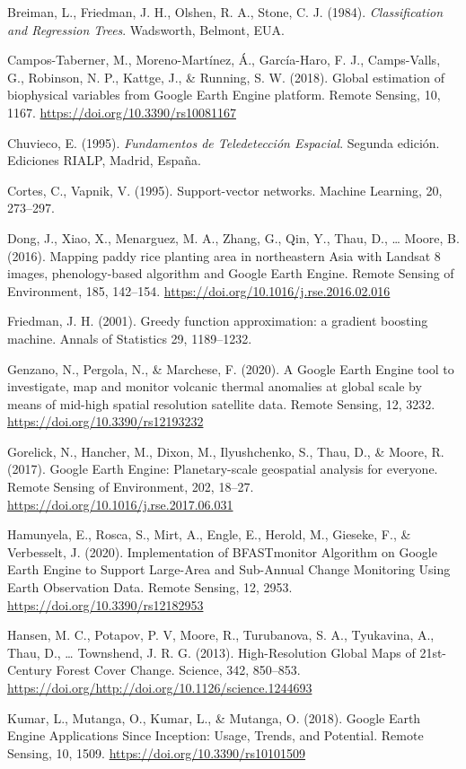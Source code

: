 \documentclass[
  12pt,
  letterpaper,
  twoside]{book}
\begin{document}
Breiman, L., Friedman, J. H., Olshen, R. A., Stone, C. J. (1984). \emph{Classification and Regression Trees}. Wadsworth, Belmont, EUA.

Campos-Taberner, M., Moreno-Martínez, Á., García-Haro, F. J., Camps-Valls, G., Robinson, N. P., Kattge, J., \& Running, S. W. (2018). Global estimation of biophysical variables from Google Earth Engine platform. Remote Sensing, 10, 1167. \url{https://doi.org/10.3390/rs10081167}

Chuvieco, E. (1995). \emph{Fundamentos de Teledetección Espacial}. Segunda edición. Ediciones RIALP, Madrid, España.

Cortes, C., Vapnik, V. (1995). Support-vector networks. Machine Learning, 20, 273--297.

Dong, J., Xiao, X., Menarguez, M. A., Zhang, G., Qin, Y., Thau, D., \ldots{} Moore, B. (2016). Mapping paddy rice planting area in northeastern Asia with Landsat 8 images, phenology-based algorithm and Google Earth Engine. Remote Sensing of Environment, 185, 142--154. \url{https://doi.org/10.1016/j.rse.2016.02.016}

Friedman, J. H. (2001). Greedy function approximation: a gradient boosting machine. Annals of Statistics 29, 1189--1232.

Genzano, N., Pergola, N., \& Marchese, F. (2020). A Google Earth Engine tool to investigate, map and monitor volcanic thermal anomalies at global scale by means of mid-high spatial resolution satellite data. Remote Sensing, 12, 3232. \url{https://doi.org/10.3390/rs12193232}

Gorelick, N., Hancher, M., Dixon, M., Ilyushchenko, S., Thau, D., \& Moore, R. (2017). Google Earth Engine: Planetary-scale geospatial analysis for everyone. Remote Sensing of Environment, 202, 18--27. \url{https://doi.org/10.1016/j.rse.2017.06.031}

Hamunyela, E., Rosca, S., Mirt, A., Engle, E., Herold, M., Gieseke, F., \& Verbesselt, J. (2020). Implementation of BFASTmonitor Algorithm on Google Earth Engine to Support Large-Area and Sub-Annual Change Monitoring Using Earth Observation Data. Remote Sensing, 12, 2953. \url{https://doi.org/10.3390/rs12182953}

Hansen, M. C., Potapov, P. V, Moore, R., Turubanova, S. A., Tyukavina, A., Thau, D., \ldots{} Townshend, J. R. G. (2013). High-Resolution Global Maps of 21st-Century Forest Cover Change. Science, 342, 850--853. \url{https://doi.org/http://doi.org/10.1126/science.1244693}

Kumar, L., Mutanga, O., Kumar, L., \& Mutanga, O. (2018). Google Earth Engine Applications Since Inception: Usage, Trends, and Potential. Remote Sensing, 10, 1509. \url{https://doi.org/10.3390/rs10101509}
\end{document}
